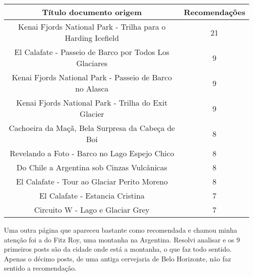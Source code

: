\begin{center}
    \begin{tabular}{|c|c|}
        \hline
        \textbf{Título documento origem} & \textbf{Recomendações} \\
        \hline
        Kenai Fjords National Park - Trilha para o Harding Icefield & 21 \\
        \hline
        El Calafate - Passeio de Barco por Todos Los Glaciares & 9 \\
        \hline
         Kenai Fjords National Park - Passeio de Barco no Alasca & 9 \\
         \hline
         Kenai Fjords National Park - Trilha do Exit Glacier & 9 \\
         \hline
         Cachoeira da Maçã, Bela Surpresa da Cabeça de Boi & 8 \\
         \hline
         Revelando a Foto - Barco no Lago Espejo Chico & 8 \\
         \hline
         Do Chile a Argentina sob Cinzas Vulcânicas & 8 \\
         \hline
         El Calafate - Tour ao Glaciar Perito Moreno & 8 \\
         \hline
         El Calafate - Estancia Cristina & 7 \\
         \hline
         Circuito W - Lago e Glaciar Grey & 7 \\
        \hline
    \end{tabular}
\end{center}

Uma outra página que apareceu bastante como recomendada e chamou minha atenção foi a do Fitz Roy, uma montanha na Argentina. Resolvi analisar 
e os 9 primeiros posts são da cidade onde está a montanha, o que faz todo sentido. Apenas o décimo posts, de uma antiga cervejaria de 
Belo Horizonte, não faz sentido a recomendação.

